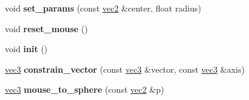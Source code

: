 \begin{DoxyCompactItemize}
\item 
\hypertarget{classArcball_ab92493e1a6d46098ac94858bed94cfb9}{void {\bfseries set\-\_\-params} (const \hyperlink{classvec2}{vec2} \&center, float radius)}\label{classArcball_ab92493e1a6d46098ac94858bed94cfb9}

\item 
\hypertarget{classArcball_a84c136cde1e8ee0c8ad9265e197399fb}{void {\bfseries reset\-\_\-mouse} ()}\label{classArcball_a84c136cde1e8ee0c8ad9265e197399fb}

\item 
\hypertarget{classArcball_ab3ff4548e3c265c9971929d185ca1fde}{void {\bfseries init} ()}\label{classArcball_ab3ff4548e3c265c9971929d185ca1fde}

\item 
\hypertarget{classArcball_a7d1844da5342c4b851eb4d99a7279754}{\hyperlink{classvec3}{vec3} {\bfseries constrain\-\_\-vector} (const \hyperlink{classvec3}{vec3} \&vector, const \hyperlink{classvec3}{vec3} \&axis)}\label{classArcball_a7d1844da5342c4b851eb4d99a7279754}

\item 
\hypertarget{classArcball_a500607cd1adbc27193462e2f3d2a2e7c}{\hyperlink{classvec3}{vec3} {\bfseries mouse\-\_\-to\-\_\-sphere} (const \hyperlink{classvec2}{vec2} \&p)}\label{classArcball_a500607cd1adbc27193462e2f3d2a2e7c}

\end{DoxyCompactItemize}
